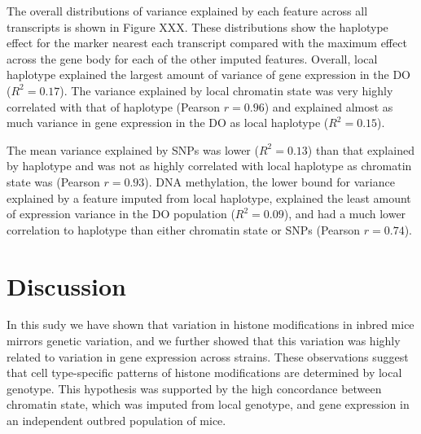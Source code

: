\documentclass[10pt,letterpaper]{article}
\begin{document}
The overall distributions of variance explained by each feature across
all transcripts is shown in Figure XXX. These distributions show the
haplotype effect for the marker nearest each transcript compared with
the maximum effect across the gene body for each of the other imputed
features. Overall, local haplotype explained the largest amount of
variance of gene expression in the DO (\(R^2 = 0.17\)). The variance
explained by local chromatin state was very highly correlated with that
of haplotype (Pearson \(r = 0.96\)) and explained almost as much
variance in gene expression in the DO as local haplotype
(\(R^2 = 0.15\)).

The mean variance explained by SNPs was lower (\(R^2 = 0.13\)) than that
explained by haplotype and was not as highly correlated with local
haplotype as chromatin state was (Pearson \(r = 0.93\)). DNA
methylation, the lower bound for variance explained by a feature imputed
from local haplotype, explained the least amount of expression variance
in the DO population (\(R^2 = 0.09\)), and had a much lower correlation
to haplotype than either chromatin state or SNPs (Pearson \(r = 0.74\)).

\hypertarget{discussion}{%
\section{Discussion}\label{discussion}}

In this sudy we have shown that variation in histone modifications in
inbred mice mirrors genetic variation, and we further showed that this
variation was highly related to variation in gene expression across
strains. These observations suggest that cell type-specific patterns of
histone modifications are determined by local genotype. This hypothesis
was supported by the high concordance between chromatin state, which was
imputed from local genotype, and gene expression in an independent
outbred population of mice.
\end{document}
